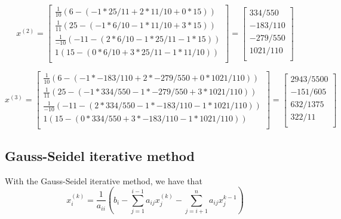 \begin{equation*}
    x^{(2)} = \begin{bmatrix}
        \frac{1}{10} \left( 6 - (-1*25/11 + 2*11/10 + 0*15) \right) \\
        \frac{1}{11} \left( 25 - (-1*6/10 - 1*11/10 + 3*15) \right) \\
        \frac{1}{-10} \left( -11 - (2*6/10 - 1*25/11 - 1*15) \right) \\
        1 \left( 15 - (0*6/10 + 3*25/11 - 1*11/10) \right) \\
    \end{bmatrix}
    = \begin{bmatrix}
        334 / 550 \\
        -183 / 110 \\
        -279 / 550 \\
        1021 / 110 \\
    \end{bmatrix}
\end{equation*}


\begin{equation*}
    x^{(3)} = \begin{bmatrix}
        \frac{1}{10} \left( 6 - (-1*-183/110 + 2*-279/550 + 0*1021/110) \right) \\
        \frac{1}{11} \left( 25 - (-1*334/550 - 1*-279/550 + 3*1021/110) \right) \\
        \frac{1}{-10} \left( -11 - (2*334/550 - 1*-183/110 - 1*1021/110) \right) \\
        1 \left( 15 - (0*334/550 + 3*-183/110 - 1*1021/110) \right) \\
    \end{bmatrix}
    = \begin{bmatrix}
        2943 / 5500 \\
        -151 / 605 \\
        632 / 1375 \\
        322 / 11 \\
    \end{bmatrix}
\end{equation*}



\subsection{Gauss-Seidel iterative method}
With the Gauss-Seidel iterative method, we have that
\begin{equation*}
    x_i^{(k)} = \frac{1}{a_{ii}} \left( b_i - \sum_{j=1}^{i-1} a_{ij}x_j^{(k)} - \sum_{j=i+1}^n a_{ij}x_j^{k-1} \right)
\end{equation*}

